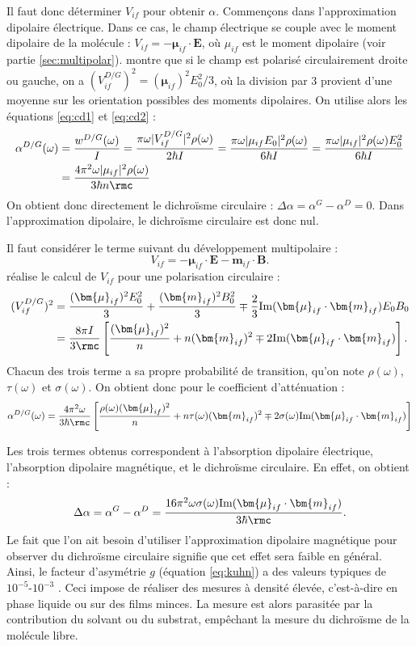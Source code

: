 Il faut donc déterminer $V_{if}$ pour obtenir $\alpha$. Commençons dans l'approximation dipolaire électrique. Dans ce cas, le champ électrique se couple avec le moment dipolaire de la molécule : $V_{if} = -\bm{\mu}_{if}\cdot \bm{E}$, où $\mu_{if}$ est le moment dipolaire (voir partie \ref{sec:multipolar}).  montre que si le champ est polarisé circulairement droite ou gauche, on a $(V_{if}^{D/G})^2 = (\bm{\mu}_{if})^2E^2_0/3$, où la division par 3 provient d'une moyenne sur les orientation possibles des moments dipolaires.
On utilise alors les équations \ref{eq:cd1} et \ref{eq:cd2} :
\begin{align*}
\alpha^{D/G}(\omega) &= \frac{w^{D/G}(\omega)}{I} = \frac{\pi \omega |V_{if}^{D/G}|^2 \rho(\omega)}{2\hbar I} 
= \frac{\pi \omega |\mu_{if}E_0|^2 \rho(\omega)}{6\hbar I} 
= \frac{\pi \omega |\mu_{if}|^2 \rho(\omega)E^2_0}{6\hbar I} \\
&= \frac{4\pi^2 \omega |\mu_{if}|^2 \rho(\omega)}{3\hbar n \rmc} 
\end{align*}
On obtient donc directement le dichroïsme circulaire : $\Delta\alpha = \alpha^G-\alpha^D = 0$. Dans l'approximation dipolaire, le dichroïsme circulaire est donc nul. \par Il faut considérer le terme suivant du développement multipolaire : 
\[V_{if} = -\bm{\mu}_{if}\cdot \bm{E} - \bm{m}_{if}\cdot \bm{B}.\] 
 réalise le calcul de $V_{if}$ pour une polarisation circulaire :
\begin{align*}
(V_{if}^{D/G})^2 &= \frac{(\bm{\mu}_{if})^2E^2_0}{3}+\frac{(\bm{m}_{if})^2B^2_0}{3} \mp \frac{2}{3}\text{Im}(\bm{\mu}_{if}\cdot\bm{m}_{if})E_0B_0 \\
&= \frac{8\pi I}{3 \rmc}\left[\frac{(\bm{\mu}_{if})^2}{n} +  n(\bm{m}_{if})^2 \mp 2 \text{Im}(\bm{\mu}_{if}\cdot\bm{m}_{if})\right]. 
\end{align*}
Chacun des trois terme a sa propre probabilité de transition, qu'on note $\rho(\omega)$, $\tau(\omega)$ et $\sigma(\omega)$. On obtient donc pour le coefficient d'atténuation :
\begin{equation*}
\alpha^{D/G}(\omega) = \frac{4\pi^2 \omega}{3\hbar \rmc}\left[\frac{\rho(\omega)(\bm{\mu}_{if})^2}{n} +  n\tau(\omega)(\bm{m}_{if})^2 \mp 2 \sigma(\omega)\text{Im}(\bm{\mu}_{if}\cdot\bm{m}_{if})\right] 
\end{equation*}

Les trois termes obtenus correspondent à l'absorption dipolaire électrique, l'absorption dipolaire magnétique, et le dichroïsme circulaire. En effet, on obtient :
\[ \Delta \alpha = \alpha^G-\alpha^D = \frac{16\pi^2 \omega\sigma(\omega)\text{Im}(\bm{\mu}_{if}\cdot\bm{m}_{if})}{3\hbar \rmc}. \]
Le fait que l'on ait besoin d'utiliser l'approximation dipolaire magnétique pour observer du dichroïsme circulaire signifie que cet effet sera faible en général. Ainsi, le facteur d'asymétrie $g$ (équation \ref{eq:kuhn}) a des valeurs typiques de $10^{-5}\text{-}10^{-3}$ . Ceci impose de réaliser des mesures à densité élevée, c'est-à-dire en phase liquide ou sur des films minces. La mesure est alors parasitée par la contribution du solvant ou du substrat, empêchant la mesure du dichroïsme de la molécule libre.
\clearpage
